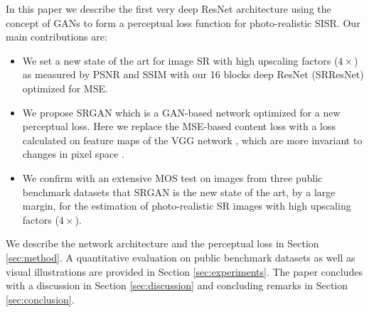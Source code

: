 \documentclass[10pt,twocolumn,letterpaper]{article}
\begin{document}
	In this paper we describe the first very deep \ac{ResNet} \cite{he2015deep,he2016identity} architecture using the concept of \acp{GAN} to form a perceptual loss function for photo-realistic \ac{SISR}. Our main contributions are:
	\begin{itemize}
		\item We set a new state of the art for image \ac{SR} with high upscaling factors ($4\times$) as measured by \ac{PSNR} and \ac{SSIM} with our 16 blocks deep \ac{ResNet} (SRResNet) optimized for \ac{MSE}. %
		\item We propose SRGAN which is a \ac{GAN}-based network optimized for a new perceptual loss. Here we replace the \ac{MSE}-based content loss  with a loss calculated on feature maps of the VGG network \cite{simonyan2014very}, which are more invariant to changes in pixel space \cite{Li2016}. %
		\item We confirm with an extensive \ac{MOS} test on images from three public benchmark datasets that SRGAN is the new state of the art, by a large margin, for the estimation of photo-realistic \ac{SR} images with high upscaling factors ($4\times$).
	\end{itemize}


	We describe the network architecture and the perceptual loss in Section \ref{sec:method}. A quantitative evaluation on public benchmark datasets as well as visual illustrations are provided in Section \ref{sec:experiments}. The paper concludes with a discussion in Section \ref{sec:discussion} and concluding remarks in Section \ref{sec:conclusion}.
	
\end{document}
